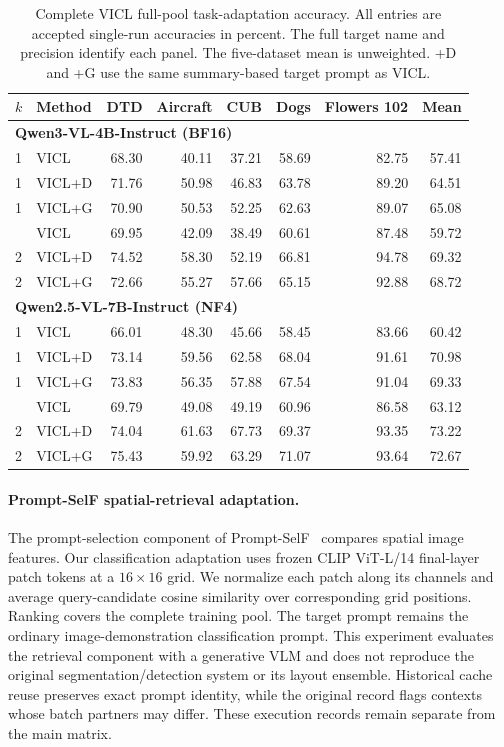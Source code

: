\documentclass[10pt,twocolumn,letterpaper]{article}
\begin{document}
\begin{table}[t]
\caption{Complete VICL full-pool task-adaptation accuracy. All entries are accepted single-run accuracies in percent. The full target name and precision identify each panel. The five-dataset mean is unweighted. +D and +G use the same summary-based target prompt as VICL.}
\label{sup:vicl_accuracy}
\centering\small\setlength{\tabcolsep}{6pt}
\begin{tabular}{llrrrrrr}
\toprule
$k$ & Method & DTD & Aircraft & CUB & Dogs & Flowers 102 & Mean \\
\midrule
\multicolumn{8}{l}{\textbf{Qwen3-VL-4B-Instruct (BF16)}} \\
1 & VICL & 68.30 & 40.11 & 37.21 & 58.69 & 82.75 & 57.41 \\
1 & VICL+D & 71.76 & 50.98 & 46.83 & 63.78 & 89.20 & 64.51 \\
1 & VICL+G & 70.90 & 50.53 & 52.25 & 62.63 & 89.07 & 65.08 \\
\addlinespace[2pt]
2 & VICL & 69.95 & 42.09 & 38.49 & 60.61 & 87.48 & 59.72 \\
2 & VICL+D & 74.52 & 58.30 & 52.19 & 66.81 & 94.78 & 69.32 \\
2 & VICL+G & 72.66 & 55.27 & 57.66 & 65.15 & 92.88 & 68.72 \\
\midrule
\multicolumn{8}{l}{\textbf{Qwen2.5-VL-7B-Instruct (NF4)}} \\
1 & VICL & 66.01 & 48.30 & 45.66 & 58.45 & 83.66 & 60.42 \\
1 & VICL+D & 73.14 & 59.56 & 62.58 & 68.04 & 91.61 & 70.98 \\
1 & VICL+G & 73.83 & 56.35 & 57.88 & 67.54 & 91.04 & 69.33 \\
\addlinespace[2pt]
2 & VICL & 69.79 & 49.08 & 49.19 & 60.96 & 86.58 & 63.12 \\
2 & VICL+D & 74.04 & 61.63 & 67.73 & 69.37 & 93.35 & 73.22 \\
2 & VICL+G & 75.43 & 59.92 & 63.29 & 71.07 & 93.64 & 72.67 \\
\bottomrule
\end{tabular}
\end{table}

\paragraph{Prompt-SelF spatial-retrieval adaptation.}
The prompt-selection component of Prompt-SelF~\cite{promptself} compares spatial image features. Our classification adaptation uses frozen CLIP ViT-L/14 final-layer patch tokens at a $16\times16$ grid. We normalize each patch along its channels and average query-candidate cosine similarity over corresponding grid positions. Ranking covers the complete training pool. The target prompt remains the ordinary image-demonstration classification prompt. This experiment evaluates the retrieval component with a generative VLM and does not reproduce the original segmentation/detection system or its layout ensemble. Historical cache reuse preserves exact prompt identity, while the original record flags contexts whose batch partners may differ. These execution records remain separate from the main matrix.
\end{document}
